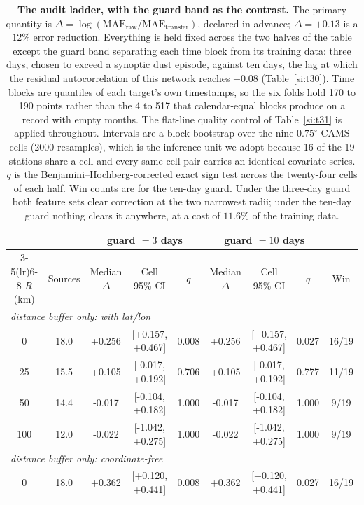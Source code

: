 \documentclass[11pt]{article}
\begin{document}
\begin{table}[htbp]\centering\footnotesize
\caption{\textbf{The audit ladder, with the guard band as the contrast.} The primary
quantity is $\Delta=\log(\mathrm{MAE_{raw}}/\mathrm{MAE_{transfer}})$, declared in advance;
$\Delta=+0.13$ is a $12\%$ error reduction. Everything is held fixed across the two halves
of the table except the guard band separating each time block from its training data:
three days, chosen to exceed a synoptic dust episode, against ten days, the lag at which
the residual autocorrelation of this network reaches $+0.08$ (Table~\ref{si:t30}). Time blocks are
quantiles of each target's own timestamps, so the six folds hold 170 to 190 points rather
than the 4 to 517 that calendar-equal blocks produce on a record with empty months. The
flat-line quality control of Table~\ref{si:t31} is applied throughout. Intervals are a block
bootstrap over the nine $0.75^\circ$ CAMS cells (2000 resamples), which is the inference
unit we adopt because 16 of the 19 stations share a cell and every same-cell pair carries
an identical covariate series. $q$ is the Benjamini--Hochberg-corrected exact sign test
across the twenty-four cells of each half. Win counts are for the ten-day guard. Under the
three-day guard both feature sets clear correction at the two narrowest radii; under the
ten-day guard nothing clears it anywhere, at a cost of $11.6\%$ of the training data.}
\label{si:t6}
\begin{tabular}{ccccccccc}\toprule
& & \multicolumn{3}{c}{guard $=3$ days} & \multicolumn{3}{c}{guard $=10$ days} & \\
\cmidrule(lr){3-5}\cmidrule(lr){6-8}
$R$ (km) & Sources & Median $\Delta$ & Cell 95\% CI & $q$ & Median $\Delta$ & Cell 95\% CI & $q$ & Win \\ \midrule
\multicolumn{9}{l}{\textit{distance buffer only: with lat/lon}} \\
0 & 18.0 & +0.256 & [+0.157, +0.467] & 0.008 & +0.256 & [+0.157, +0.467] & 0.027 & 16/19 \\
25 & 15.5 & +0.105 & [-0.017, +0.192] & 0.706 & +0.105 & [-0.017, +0.192] & 0.777 & 11/19 \\
50 & 14.4 & -0.017 & [-0.104, +0.182] & 1.000 & -0.017 & [-0.104, +0.182] & 1.000 & 9/19 \\
100 & 12.0 & -0.022 & [-1.042, +0.275] & 1.000 & -0.022 & [-1.042, +0.275] & 1.000 & 9/19 \\
\multicolumn{9}{l}{\textit{distance buffer only: coordinate-free}} \\
0 & 18.0 & +0.362 & [+0.120, +0.441] & 0.008 & +0.362 & [+0.120, +0.441] & 0.027 & 16/19 \\

\end{tabular}
\end{table}
\end{document}
